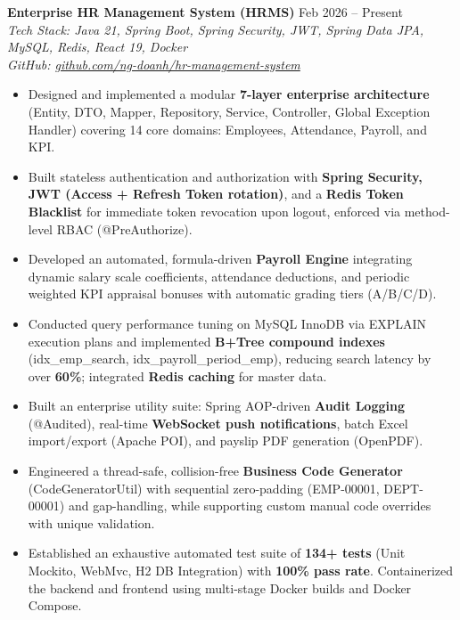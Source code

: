 ﻿\documentclass[10pt,a4paper]{article}
\begin{document}
\textbf{Enterprise HR Management System (HRMS)} \hfill Feb 2026 -- Present \\
\textit{Tech Stack: Java 21, Spring Boot, Spring Security, JWT, Spring Data JPA, MySQL, Redis, React 19, Docker} \\
\textit{GitHub: \href{https://github.com/ng-doanh/hr-management-system}{github.com/ng-doanh/hr-management-system}}
\begin{itemize}[leftmargin=1.2em, itemsep=1.8pt, topsep=2pt]
    \item Designed and implemented a modular \textbf{7-layer enterprise architecture} (Entity, DTO, Mapper, Repository, Service, Controller, Global Exception Handler) covering 14 core domains: Employees, Attendance, Payroll, and KPI.
    \item Built stateless authentication and authorization with \textbf{Spring Security, JWT (Access + Refresh Token rotation)}, and a \textbf{Redis Token Blacklist} for immediate token revocation upon logout, enforced via method-level RBAC (@PreAuthorize).
    \item Developed an automated, formula-driven \textbf{Payroll Engine} integrating dynamic salary scale coefficients, attendance deductions, and periodic weighted KPI appraisal bonuses with automatic grading tiers (A/B/C/D).
    \item Conducted query performance tuning on MySQL InnoDB via EXPLAIN execution plans and implemented \textbf{B+Tree compound indexes} (idx\_emp\_search, idx\_payroll\_period\_emp), reducing search latency by over \textbf{60\%}; integrated \textbf{Redis caching} for master data.
    \item Built an enterprise utility suite: Spring AOP-driven \textbf{Audit Logging} (@Audited), real-time \textbf{WebSocket push notifications}, batch Excel import/export (Apache POI), and payslip PDF generation (OpenPDF).
    \item Engineered a thread-safe, collision-free \textbf{Business Code Generator} (CodeGeneratorUtil) with sequential zero-padding (EMP-00001, DEPT-00001) and gap-handling, while supporting custom manual code overrides with unique validation.
    \item Established an exhaustive automated test suite of \textbf{134+ tests} (Unit Mockito, WebMvc, H2 DB Integration) with \textbf{100\% pass rate}. Containerized the backend and frontend using multi-stage Docker builds and Docker Compose.
\end{itemize}

\vspace{4pt}
\end{document}
